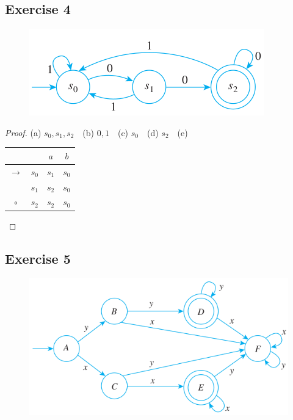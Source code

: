 \documentclass[14pt]{extarticle}
\begin{document}
\subsection{Exercise 4}
\begin{figure}[ht!]
\centering
\includegraphics[scale=0.5]{../images/12.2.4.png}
\end{figure}

\begin{proof}
(a) \(s_0, s_1, s_2\) \,\, (b) \(0, 1\) \,\, (c) \(s_0\) \,\, (d) \(s_2\) \,\, (e) 
\begin{tabular}{|c|c|c|c|}
\hline
\(\) & \(\) & \(a\) & \(b\) \\
\hline
\(\to\) & \(s_0\) & \(s_1\) & \(s_0\) \\
\hline
\(\) & \(s_1\) & \(s_2\) & \(s_0\) \\
\hline
\(\circ\) & \(s_2\) & \(s_2\) & \(s_0\) \\
\hline
\end{tabular}
\end{proof}

\subsection{Exercise 5}
\begin{figure}[ht!]
\centering
\includegraphics[scale=0.5]{../images/12.2.5.png}
\end{figure}
\end{document}
